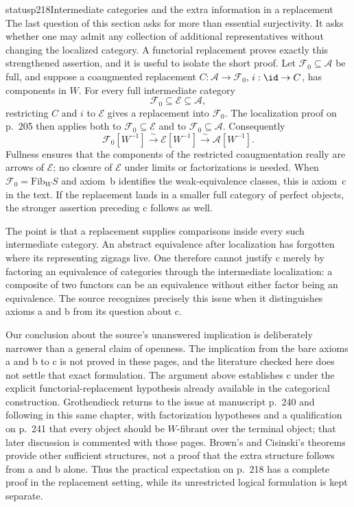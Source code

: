 \begin{dcomment}{status}{p218}{Intermediate categories and the extra information in a replacement}
The last question of this section asks for more than essential surjectivity. It asks whether one may admit any collection of additional representatives without changing the localized category. A functorial replacement proves exactly this strengthened assertion, and it is useful to isolate the short proof. Let $\mathcal F_0\subseteq\mathcal A$ be full, and suppose a coaugmented replacement $C:\mathcal A\to\mathcal F_0$, $i:\id\to C$, has components in $W$. For every full intermediate category
\[
 \mathcal F_0\subseteq\mathcal E\subseteq\mathcal A,
\]
restricting $C$ and $i$ to $\mathcal E$ gives a replacement into $\mathcal F_0$. The localization proof on p.~205 then applies both to $\mathcal F_0\subseteq\mathcal E$ and to $\mathcal F_0\subseteq\mathcal A$. Consequently
\[
 \mathcal F_0[W^{-1}]\xrightarrow{\sim}
 \mathcal E[W^{-1}]\xrightarrow{\sim}
 \mathcal A[W^{-1}].
\]
Fullness ensures that the components of the restricted coaugmentation really are arrows of $\mathcal E$; no closure of $\mathcal E$ under limits or factorizations is needed. When $\mathcal F_0=\mathrm{Fib}_W S$ and axiom~b identifies the weak-equivalence classes, this is axiom~c in the text. If the replacement lands in a smaller full category of perfect objects, the stronger assertion preceding c follows as well.

The point is that a replacement supplies comparisons inside every such intermediate category. An abstract equivalence after localization has forgotten where its representing zigzags live. One therefore cannot justify c merely by factoring an equivalence of categories through the intermediate localization: a composite of two functors can be an equivalence without either factor being an equivalence. The source recognizes precisely this issue when it distinguishes axioms a and b from its question about c.

Our conclusion about the source's unanswered implication is deliberately narrower than a general claim of openness. The implication from the bare axioms a and b to c is not proved in these pages, and the literature checked here does not settle that exact formulation. The argument above establishes c under the explicit functorial-replacement hypothesis already available in the categorical construction. Grothendieck returns to the issue at manuscript p.~240 and following in this same chapter, with factorization hypotheses and a qualification on p.~241 that every object should be $W$-fibrant over the terminal object; that later discussion is commented with those pages. Brown's and Cisinski's theorems provide other sufficient structures, not a proof that the extra structure follows from a and b alone. Thus the practical expectation on p.~218 has a complete proof in the replacement setting, while its unrestricted logical formulation is kept separate.
\end{dcomment}

